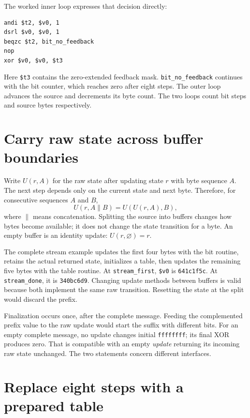 

The worked inner loop expresses that decision directly:
\begin{verbatim}
andi $t2, $v0, 1
dsrl $v0, $v0, 1
beqzc $t2, bit_no_feedback
nop
xor $v0, $v0, $t3
\end{verbatim}
Here \texttt{\$t3} contains the zero-extended feedback mask.
\texttt{bit\_no\_feedback} continues with the bit counter, which reaches zero
after eight steps. The outer loop advances the source and decrements its byte
count. The two loops count bit steps and source bytes respectively.

\section{Carry raw state across buffer boundaries}

Write $U(r,A)$ for the raw state after updating state $r$ with byte sequence $A$.
The next step depends only on the current state and next byte. Therefore,
for consecutive sequences $A$ and $B$,
\[
  U(r,A\mathbin{\|}B)=U(U(r,A),B),
\]
where $\|$ means concatenation. Splitting the source into buffers changes how
bytes become available; it does not change the state transition for a byte.
An empty buffer is an identity update: $U(r,\varnothing)=r$.



The complete stream example updates the first four bytes with the bit routine,
retains the actual returned state, initializes a table, then updates the remaining
five bytes with the table routine. At \texttt{stream\_first}, \texttt{\$v0}
is \texttt{641c1f5c}. At \texttt{stream\_done}, it is \texttt{340bc6d9}.
Changing update methods between buffers is valid because both implement the
same raw transition. Resetting the state at the split would discard the prefix.

Finalization occurs once, after the complete message. Feeding the complemented
prefix value to the raw update would start the suffix with different bits.
For an empty complete message, no update changes initial \texttt{ffffffff};
its final XOR produces zero. That is compatible with an empty \emph{update}
returning its incoming raw state unchanged. The two statements concern different
interfaces.

\section{Replace eight steps with a prepared table}

